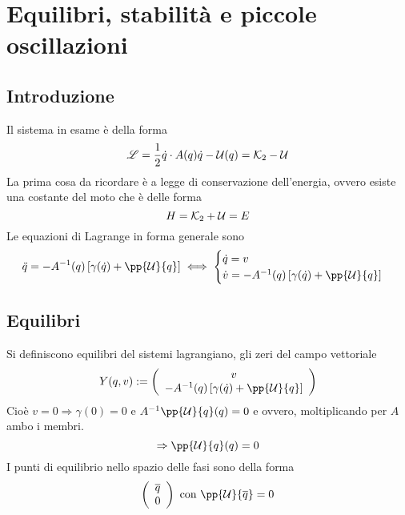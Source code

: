 \documentclass[Main.tex]{subfiles}
\begin{document}
\section{Equilibri, stabilità e piccole oscillazioni} \toc


\subsection{Introduzione}
Il sistema in esame è della forma
\begin{equation}
	\mathscr{L} = \frac{1}{2} \dot q \cdot A(q) \dot q - \mathcal{U} (q) = \mathcal{K}_2 - \mathcal{U}
\end{equation}
La prima cosa da ricordare è a legge di conservazione dell'energia, ovvero esiste una costante del moto che è delle forma
\begin{equation}
	H= \mathcal{K}_2 + \mathcal{U} = E
\end{equation}
Le equazioni di Lagrange in forma generale sono
\begin{equation}
	\ddot q = -A^{-1}(q) \left[ \gamma (\dot q) + \pp{\U}{q} \right] \iff \begin{cases}
 	\dot q = v\\
 	\dot v = -A^{-1} (q)\left[ \gamma (\dot q) + \pp{\U}{q} \right] 
 \end{cases}
\end{equation}

\subsection{Equilibri}
\begin{df}[equilibrio]
Si definiscono equilibri del sistemi lagrangiano, gli zeri del campo vettoriale
\begin{equation}
	Y(q,v):=\vec{v \\ -A^{-1} (q)\left[ \gamma (\dot q) + \pp{\U}{q} \right]}
\end{equation}
Cioè $v=0 \Rightarrow \gamma(0)=0$ e $A^{-1} \pp{\U}{q}(q)=0$ e ovvero, moltiplicando per $A$ ambo i membri.
\begin{equation}
	\Rightarrow \pp{\U}{q}(q)=0
\end{equation}
I punti di equilibrio nello spazio delle fasi sono della forma 
\begin{equation}
	\vec{ \overline q \\ 0}\text{ con } \pp{\U}{\overline q}=0
\end{equation}
\end{df}
\end{document}
